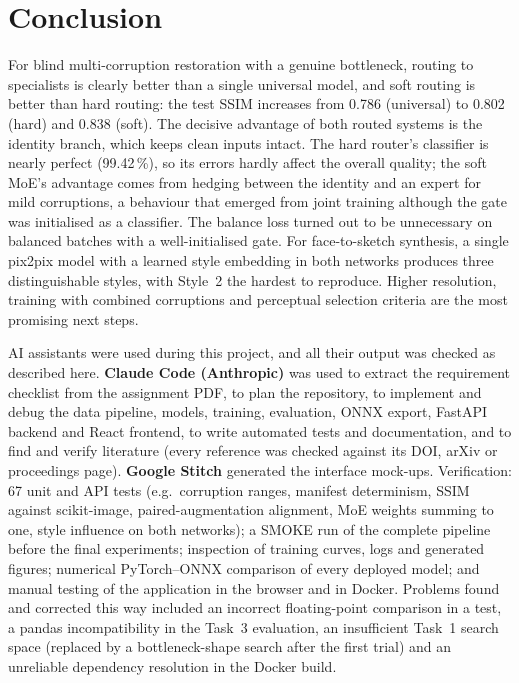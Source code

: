 \documentclass[conference]{IEEEtran}
\begin{document}
\section{Conclusion}
For blind multi-corruption restoration with a genuine bottleneck, routing to specialists is clearly better
than a single universal model, and soft routing is better than hard routing: the test SSIM increases from
0.786 (universal) to 0.802 (hard) and 0.838 (soft). The decisive advantage of both routed systems is the
identity branch, which keeps clean inputs intact. The hard router's classifier is nearly perfect (99.42\,\%),
so its errors hardly affect the overall quality; the soft MoE's advantage comes from hedging between the
identity and an expert for mild corruptions, a behaviour that emerged from joint training although the gate
was initialised as a classifier. The balance loss turned out to be unnecessary on balanced batches with a
well-initialised gate. For face-to-sketch synthesis, a single pix2pix model with a learned style embedding in
both networks produces three distinguishable styles, with Style~2 the hardest to reproduce. Higher
resolution, training with combined corruptions and perceptual selection criteria are the most promising
next steps.

\appendix[AI Use]
AI assistants were used during this project, and all their output was checked as described here.
\textbf{Claude Code (Anthropic)} was used to extract the requirement checklist from the assignment PDF, to
plan the repository, to implement and debug the data pipeline, models, training, evaluation, ONNX export,
FastAPI backend and React frontend, to write automated tests and documentation, and to find and verify
literature (every reference was checked against its DOI, arXiv or proceedings page). \textbf{Google Stitch}
generated the interface mock-ups. Verification: 67 unit and API tests (e.g.\ corruption ranges, manifest
determinism, SSIM against scikit-image, paired-augmentation alignment, MoE weights summing to one, style
influence on both networks); a SMOKE run of the complete pipeline before the final experiments; inspection of
training curves, logs and generated figures; numerical PyTorch--ONNX comparison of every deployed model; and
manual testing of the application in the browser and in Docker. Problems found and corrected this way included
an incorrect floating-point comparison in a test, a pandas incompatibility in the Task~3 evaluation, an
insufficient Task~1 search space (replaced by a bottleneck-shape search after the first trial) and an
unreliable dependency resolution in the Docker build.



\end{document}
